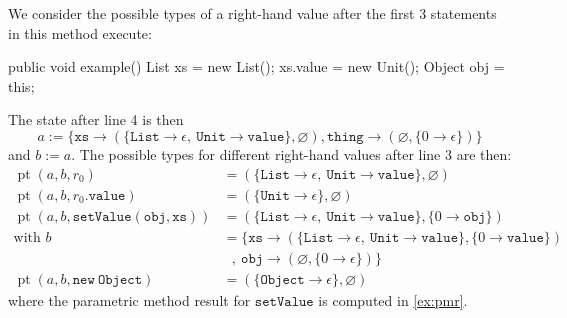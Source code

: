 \begin{example}
\label{ex:pt}
We consider the possible types of a right-hand value after the first 3 statements in this method execute:
\begin{javacode}
public void example() {
    List xs = new List();
    xs.value = new Unit();
    Object obj = this;
}
\end{javacode}
The state after line 4 is then \[ a := \{\mathtt{xs} \to (\{\mathtt{List} \to \epsilon,\ \mathtt{Unit} \to \mathtt{value} \}, \varnothing), \mathtt{thing} \to (\varnothing, \{ 0 \to \epsilon \}) \}\] and $b := a$.
The possible types for different right-hand values after line 3 are then:
\begin{align*}
    \operatorname{pt}(a,b,r_0) &= (\{ \mathtt{List} \to \epsilon,\ \mathtt{Unit} \to \mathtt{value} \}, \varnothing)\\
    \operatorname{pt}(a,b,r_0.\mathtt{value}) &= (\{ \mathtt{Unit} \to \epsilon \}, \varnothing)\\
    \operatorname{pt}(a,b,\mathtt{setValue}(\mathtt{obj}, \mathtt{xs})) &= (\{ \mathtt{List} \to \epsilon,\ \mathtt{Unit} \to \mathtt{value} \}, \{ 0 \to \mathtt{obj} \}) \\
    \text{with } b &= \{ \mathtt{xs} \to (\{ \mathtt{List} \to \epsilon,\ \mathtt{Unit} \to \mathtt{value} \}, \{ 0 \to \mathtt{value} \})\\
    &\ \ \  ,\  \mathtt{obj} \to (\varnothing, \{ 0 \to \epsilon \}) \} \\
    \operatorname{pt}(a,b,\mathtt{new\ Object}) &= (\{ \mathtt{Object} \to \epsilon \}, \varnothing)
\end{align*}
where the parametric method result for $\mathtt{setValue}$ is computed in \cref{ex:pmr}.
\end{example}

